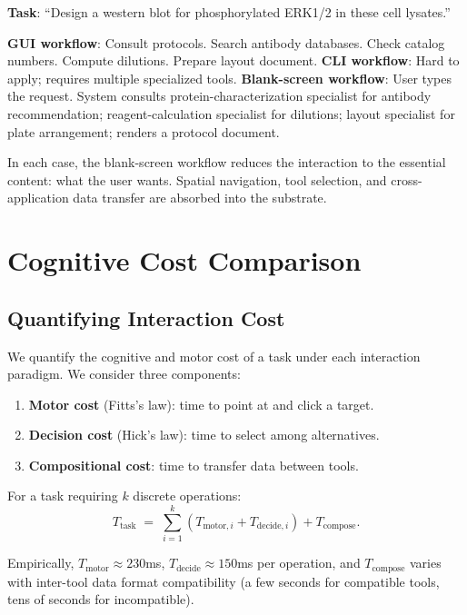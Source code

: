 \documentclass[11pt,a4paper]{article}
\theoremstyle{definition}
\theoremstyle{remark}
\begin{document}
\textbf{Task}: ``Design a western blot for phosphorylated ERK1/2 in these cell lysates.''

\textbf{GUI workflow}: Consult protocols. Search antibody databases. Check catalog numbers. Compute dilutions. Prepare layout document.
\textbf{CLI workflow}: Hard to apply; requires multiple specialized tools.
\textbf{Blank-screen workflow}: User types the request. System consults protein-characterization specialist for antibody recommendation; reagent-calculation specialist for dilutions; layout specialist for plate arrangement; renders a protocol document.

In each case, the blank-screen workflow reduces the interaction to the essential content: what the user wants. Spatial navigation, tool selection, and cross-application data transfer are absorbed into the substrate.

\section{Cognitive Cost Comparison}
\label{sec:cognitive}

\subsection{Quantifying Interaction Cost}

We quantify the cognitive and motor cost of a task under each interaction paradigm. We consider three components:
\begin{enumerate}
    \item \textbf{Motor cost} (Fitts's law): time to point at and click a target.
    \item \textbf{Decision cost} (Hick's law): time to select among alternatives.
    \item \textbf{Compositional cost}: time to transfer data between tools.
\end{enumerate}

For a task requiring $k$ discrete operations:
\begin{equation}
\label{eq:total}
T_{\text{task}} \;=\; \sum_{i=1}^k (T_{\text{motor},i} + T_{\text{decide},i}) + T_{\text{compose}}.
\end{equation}

Empirically, $T_{\text{motor}} \approx 230$ms, $T_{\text{decide}} \approx 150$ms per operation, and $T_{\text{compose}}$ varies with inter-tool data format compatibility (a few seconds for compatible tools, tens of seconds for incompatible).
\end{document}
